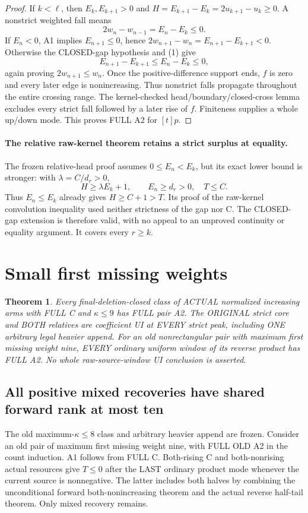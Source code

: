 \documentclass[11pt]{article}
\newtheorem{theorem}[proposition]{Theorem}
\begin{document}
\begin{proof}
If $k<\ell$, then $E_k,E_{k+1}>0$ and
$H=E_{k+1}-E_k=2u_{k+1}-u_k\ge0$. A nonstrict weighted fall means
\[
          2w_n-w_{n-1}=E_n-E_k\le0.                    \tag{1}
\]
If $E_n<0$, A1 implies $E_{n+1}\le0$, hence
$2w_{n+1}-w_n=E_{n+1}-E_{k+1}<0$.
Otherwise the CLOSED-gap hypothesis and (1) give
\[
 E_{n+1}-E_{k+1}\le E_n-E_k\le0,
\]
again proving $2w_{n+1}\le w_n$. Once the positive-difference support
ends, $f$ is zero and every later edge is nonincreasing.
Thus nonstrict falls propagate throughout the entire crossing range.
The kernel-checked head/boundary/closed-cross lemma excludes every
strict fall followed by a later rise of $f$. Finiteness supplies a
whole up/down mode. This proves FULL A2 for $[t]p$.
\end{proof}

\paragraph{The relative raw-kernel theorem retains a strict surplus at equality.}
The frozen relative-head proof assumes $0\le E_n<E_k$, but its exact
lower bound is stronger: with $\lambda=C/d_r>0$,
\[
 H\ge\lambda E_k+1,\qquad E_n\ge d_r>0,\quad T\le C.
\]
Thus $E_n\le E_k$ already gives $H\ge C+1>T$. Its proof of the
raw-kernel convolution inequality used neither strictness of the gap
nor C. The CLOSED-gap extension is therefore valid, with no appeal to
an unproved continuity or equality argument. It covers every $r\ge k$.

\section{Small first missing weights}

\par\medskip

\begin{theorem}
Every final-deletion-closed class of ACTUAL normalized increasing arms
with FULL C and $\kappa\le9$ has FULL pair A2. The ORIGINAL strict
core and BOTH relatives are coefficient UI at EVERY strict peak,
including ONE arbitrary legal heavier append.
For an old nonrectangular pair with maximum first missing weight nine,
EVERY ordinary uniform window of its reverse product has FULL A2.
No whole raw-source-window UI conclusion is asserted.
\end{theorem}

\subsection{All positive mixed recoveries have shared forward rank at most ten}
The old maximum-$\kappa\le8$ class and arbitrary heavier append are
frozen. Consider an old pair of maximum first missing weight nine,
with FULL OLD A2 in the count induction. A1 follows from FULL C.
Both-rising C and both-nonrising actual resources give $T\le0$ after
the LAST ordinary product mode whenever the current source is nonnegative.
The latter includes both halves by combining the unconditional forward
both-nonincreasing theorem and the actual reverse half-tail theorem.
Only mixed recovery remains.
\end{document}
